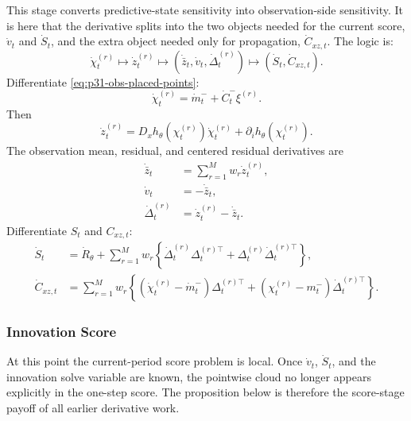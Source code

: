 \documentclass[11pt]{article}
\numberwithin{equation}{section}
\begin{document}
This stage converts predictive-state sensitivity into observation-side
sensitivity.  It is here that the derivative splits into the two objects needed
for the current score, \(\dot v_t\) and \(\dot S_t\), and the extra object
needed only for propagation, \(\dot C_{xz,t}\).  The logic is:
\begin{equation}
  \dot\chi_t^{(r)}
  \longmapsto
  \dot z_t^{(r)}
  \longmapsto
  (\dot{\bar z}_t,\dot v_t,\dot\Delta_t^{(r)})
  \longmapsto
  (\dot S_t,\dot C_{xz,t}).
  \label{eq:p32-observation-derivative-flow}
\end{equation}
Differentiate \eqref{eq:p31-obs-placed-points}:
\begin{equation}
  \dot\chi_t^{(r)}
  =
  \dot m_t^-+\dot C_t^-\xi^{(r)}.
  \label{eq:p31-dot-obs-place}
\end{equation}
Then
\begin{equation}
  \dot z_t^{(r)}
  =
  D_xh_\theta(\chi_t^{(r)})\dot\chi_t^{(r)}
  +\partial_i h_\theta(\chi_t^{(r)}).
  \label{eq:p31-dot-obs-value}
\end{equation}
The observation mean, residual, and centered residual derivatives are
\begin{align}
  \dot{\bar z}_t&=\sum_{r=1}^M w_r\dot z_t^{(r)},
  \label{eq:p31-dot-zbar}\\
  \dot v_t&=-\dot{\bar z}_t,
  \label{eq:p31-dot-v}\\
  \dot\Delta_t^{(r)}&=\dot z_t^{(r)}-\dot{\bar z}_t.
  \label{eq:p31-dot-Delta}
\end{align}
Differentiate \(S_t\) and \(C_{xz,t}\):
\begin{align}
  \dot S_t
  &=
  \dot R_\theta
  +
  \sum_{r=1}^M w_r
  \left\{
  \dot\Delta_t^{(r)}\Delta_t^{(r)\top}
  +\Delta_t^{(r)}\dot\Delta_t^{(r)\top}
  \right\},
  \label{eq:p31-dot-S}\\
  \dot C_{xz,t}
  &=
  \sum_{r=1}^M w_r
  \left\{
  (\dot\chi_t^{(r)}-\dot m_t^-)\Delta_t^{(r)\top}
  +(\chi_t^{(r)}-m_t^-)\dot\Delta_t^{(r)\top}
  \right\}.
  \label{eq:p31-dot-Cxz}
\end{align}

\subsubsection{Innovation Score}

At this point the current-period score problem is local.  Once \(\dot v_t\),
\(\dot S_t\), and the innovation solve variable are known, the pointwise cloud no
longer appears explicitly in the one-step score.  The proposition below is
therefore the score-stage payoff of all earlier derivative work.
\end{document}
